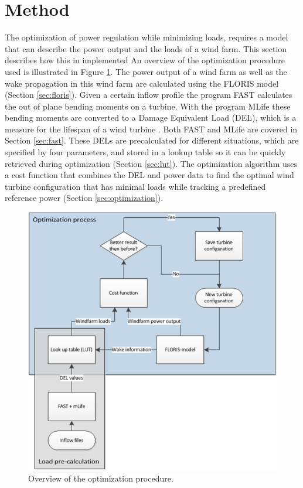 \section{Method} \label{sec:method}
The optimization of power regulation while minimizing loads, requires a model that can describe the power output and the loads of a wind farm. This section describes how this in implemented \newline
An overview of the optimization procedure used is illustrated in Figure \ref{fig:optim}.
The power output of a wind farm as well as the wake propagation in this wind farm are calculated using the FLORIS model \cite{FLORIS} (Section \ref{sec:floris}). Given a certain inflow profile the program FAST calculates the out of plane bending moments on a turbine. With the program MLife these bending moments are converted to a Damage Equivalent Load (DEL), which is a measure for the lifespan of a wind turbine \cite{MLife}. Both FAST and MLife are covered in Section \ref{sec:fast}. These DELs are precalculated for different situations, which are specified by four parameters, and stored in a lookup table so it can be quickly retrieved during optimization (Section \ref{sec:lut}). The optimization algorithm uses a cost function that combines the DEL and power data to find the optimal wind turbine configuration that has minimal loads while tracking a predefined reference power (Section \ref{sec:optimization}).

\begin{figure}
	\includegraphics[width=\linewidth]{./Figures/OptimizationProcess.png}
	\caption{Overview of the optimization procedure.}
	\label{fig:optim}
\end{figure}


